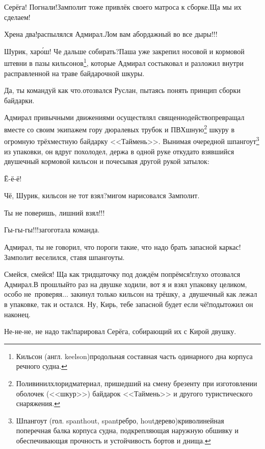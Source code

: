 \diagdash Серёга! Погнали!\mdash Замполит тоже привлёк своего матроса к сборке.\mdash Ща мы их сделаем!

\diagdash Хрена два!\mdash распылялся Адмирал.\mdash Лом вам абордажный во все дыры!!! 

\renewcommand*{\thefootnote}{\arabic{footnote}}
\setcounter{footnote}{0} 
\diagdash Шурик, хар\'{о}ш! Че дальше собирать?\mdash Паша уже закрепил носовой и кормовой штевни в пазы кильсонов\footnote{Кильсон (англ. keelson)\mdash продольная составная часть одинарного дна корпуса речного судна\cite{МорскойСправочник}.}, которые Адмирал состыковал и разложил внутри расправленной на траве байдарочной шкуры.

\diagdash Да, ты командуй как что.\mdash отозвался Руслан, пытаясь понять принцип сборки байдарки.

Адмирал привычными движениями осуществлял священнодейство\mdash превращал вместе со своим экипажем гору дюралевых трубок и ПВХ\sdash шную\footnote{Поливинилхлорид\mdash материал, пришедший на смену брезенту при изготовлении оболочек (<<шкур>>) байдарок <<Таймень>> и другого туристического снаряжения.} шкуру в огромную трёхместную байдарку <<Таймень>>. Вынимая очередной шпангоут\footnote{Шпангоут (гол. spanthout, spant\mdash ребро, hout\mdash дерево)\mdash криволинейная поперечная балка корпуса судна, подкрепляющая наружную обшивку и обеспечивающая прочность и устойчивость бортов и днища\cite{МорскойСправочник}.} из упаковки, он вдруг похолодел, держа в одной руке откуда\sdash то взявшийся двушечный кормовой кильсон и почесывая другой рукой затылок:

\diagdash Ё-ё-ё!

\diagdash Чё, Шурик, кильсон не тот взял?\mdash мигом нарисовался Замполит.

\diagdash Ты не поверишь, лишний взял!!!

\diagdash Гы-гы-гы!!!\mdash загоготала команда.

\diagdash Адмирал, ты не говорил, что пороги такие, что надо брать запасной каркас!\mdash Замполит веселился, ставя шпангоуты.

\diagdash Смейся, смейся! Ща как тридцаточку под дождём попрёмся!\mdash глухо отозвался Адмирал.\mdash В прошлый\sdash то раз на двушке ходили, вот я и взял упаковку целиком, особо не~проверяя$\ldots$ закинул только кильсон на трёшку, а~двушечный как лежал в упаковке, так и остался. Ну, Кирь, тебе запасной будет если чё!\mdash подытожил он наконец.

\diagdash Не-не-не, не надо так!\mdash парировал Серёга, собирающий их с Кирой двушку.

